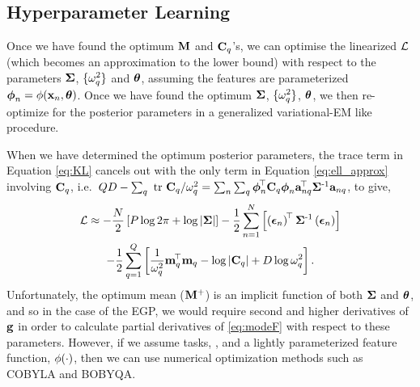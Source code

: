 \subsection{Hyperparameter Learning}
Once we have found the optimum $\mathbf{M}$ and $\mathbf{C}_q$'s, we can optimise
the linearized $\mathcal{L}$ (which becomes an approximation to the lower bound)
with respect to the parameters $\mathbf{\Sigma}$, $\{ \omega^2_q \}$ and $\boldsymbol\theta$,
assuming the features are parameterized $\boldsymbol\phi_n = \phi\!\left({{\mathbf{x}_n,
    \boldsymbol\theta}}\right)$. Once we have found the optimum $\mathbf{\Sigma}$, $\{ \omega^2_q \}$,
$\boldsymbol\theta$, we then re-optimize for the posterior parameters  in a generalized
variational-EM like procedure.

When we have determined the optimum posterior parameters, the trace term in
Equation \eqref{eq:KL} cancels out with the only term in Equation \eqref{eq:ell_approx} 
involving $\mathbf{C}_q$, i.e.\ $QD -
\sum_q\mbox{ \rm tr }{\ensuremath{\mathbf{C}}_q}/\omega^2_q = 
\sum_n \sum_q \boldsymbol\phi_n^{\!\top}\mathbf{C}_q  \boldsymbol\phi_n\mathbf{a}_{nq}^{\!\top}\mathbf{\Sigma}^{\text{-}1} \mathbf{a}_{nq}$,
to give,
\begin{multline}
    \mathcal{L} \approx 
        - \frac{N}{2}\left[{P\log{2\pi} + \log\left|{\mathbf{\Sigma}}\right|}\right]
    - \frac{1}{2} \sum^N_{n=1} \left[{
        \left({\boldsymbol{ \epsilon }_n}\right)^{\!\top}
        \mathbf{\Sigma}^{\text{-}1}
        \left({\boldsymbol{ \epsilon }_n}\right)}\right] \\
        -\frac{1}{2} \sum^{Q}_{q=1} \left[{
        \frac{1}{\omega^2_q} \mathbf{m}_q^{\!\top}\mathbf{m}_q
        - \log\left|{\mathbf{C}_q}\right| + D \log \omega^2_q}\right].
    \label{eq:modeF}
\end{multline}
Unfortunately, the optimum mean ($\mathbf{M}^{+}$) is an implicit function of both $\mathbf{\Sigma}$ and
$\boldsymbol\theta$, and so in the case of the EGP, we would require second and higher
derivatives of $\mathbf{g}$ in order to calculate partial derivatives of
\eqref{eq:modeF} with respect to these parameters. 
However, if we assume  tasks, \otdim, and a lightly
parameterized feature function, $\phi\!\left({{\cdot}}\right)$, then we can use numerical 
optimization methods such as COBYLA and BOBYQA. 



 
